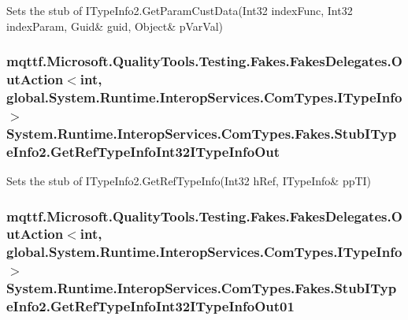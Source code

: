 Sets the stub of I\-Type\-Info2.\-Get\-Param\-Cust\-Data(Int32 index\-Func, Int32 index\-Param, Guid\& guid, Object\& p\-Var\-Val)

\hypertarget{class_system_1_1_runtime_1_1_interop_services_1_1_com_types_1_1_fakes_1_1_stub_i_type_info2_ac1129ea2a85b5b93eb192ecfb9097a8b}{
\subsubsection[{Get\-Ref\-Type\-Info\-Int32\-I\-Type\-Info\-Out}]{\setlength{\rightskip}{0pt plus 5cm}mqttf.\-Microsoft.\-Quality\-Tools.\-Testing.\-Fakes.\-Fakes\-Delegates.\-Out\-Action$<$int, global.\-System.\-Runtime.\-Interop\-Services.\-Com\-Types.\-I\-Type\-Info$>$ System.\-Runtime.\-Interop\-Services.\-Com\-Types.\-Fakes.\-Stub\-I\-Type\-Info2.\-Get\-Ref\-Type\-Info\-Int32\-I\-Type\-Info\-Out}}\label{class_system_1_1_runtime_1_1_interop_services_1_1_com_types_1_1_fakes_1_1_stub_i_type_info2_ac1129ea2a85b5b93eb192ecfb9097a8b}


Sets the stub of I\-Type\-Info2.\-Get\-Ref\-Type\-Info(Int32 h\-Ref, I\-Type\-Info\& pp\-T\-I)

\hypertarget{class_system_1_1_runtime_1_1_interop_services_1_1_com_types_1_1_fakes_1_1_stub_i_type_info2_a1549e1b78f498dbeffb16dd7bf86106d}{
\subsubsection[{Get\-Ref\-Type\-Info\-Int32\-I\-Type\-Info\-Out01}]{\setlength{\rightskip}{0pt plus 5cm}mqttf.\-Microsoft.\-Quality\-Tools.\-Testing.\-Fakes.\-Fakes\-Delegates.\-Out\-Action$<$int, global.\-System.\-Runtime.\-Interop\-Services.\-Com\-Types.\-I\-Type\-Info$>$ System.\-Runtime.\-Interop\-Services.\-Com\-Types.\-Fakes.\-Stub\-I\-Type\-Info2.\-Get\-Ref\-Type\-Info\-Int32\-I\-Type\-Info\-Out01}}\label{class_system_1_1_runtime_1_1_interop_services_1_1_com_types_1_1_fakes_1_1_stub_i_type_info2_a1549e1b78f498dbeffb16dd7bf86106d}


